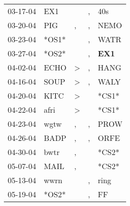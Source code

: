 \begin{supertabular}{p{0.07\textwidth}p{0.06\textwidth}p{0.02\textwidth}p{0.02\textwidth}p{0.06\textwidth}}
          03-17-04\textsuperscript{} &            EX1\textsuperscript{} &                  &                , &            40s\textsuperscript{} \\
          03-20-04\textsuperscript{} &            PIG\textsuperscript{} &                , &                , &           NEMO\textsuperscript{} \\
          03-23-04\textsuperscript{} &                            *OS1* &                  &                , &           WATR\textsuperscript{} \\
          03-27-04\textsuperscript{} &                            *OS2* &                  &                , &   \textbf{EX1\textsuperscript{}} \\
          04-02-04\textsuperscript{} &           ECHO\textsuperscript{} &     \textgreater &                , &           HANG\textsuperscript{} \\
          04-16-04\textsuperscript{} &           SOUP\textsuperscript{} &     \textgreater &                , &           WALY\textsuperscript{} \\
          04-20-04\textsuperscript{} &           KITC\textsuperscript{} &     \textgreater &                  &                            *CS1* \\
          04-22-04\textsuperscript{} &           afri\textsuperscript{} &     \textgreater &                  &                            *CS1* \\
          04-23-04\textsuperscript{} &           wgtw\textsuperscript{} &                , &                , &           PROW\textsuperscript{} \\
          04-26-04\textsuperscript{} &           BADP\textsuperscript{} &                , &                , &           ORFE\textsuperscript{} \\
          04-30-04\textsuperscript{} &           bwtr\textsuperscript{} &                , &                  &                            *CS2* \\
          05-07-04\textsuperscript{} &           MAIL\textsuperscript{} &                , &                  &                            *CS2* \\
          05-13-04\textsuperscript{} &           wwrn\textsuperscript{} &                  &                , &           ring\textsuperscript{} \\
          05-19-04\textsuperscript{} &                            *OS2* &                  &                , &             FF\textsuperscript{} \\

\end{supertabular}
